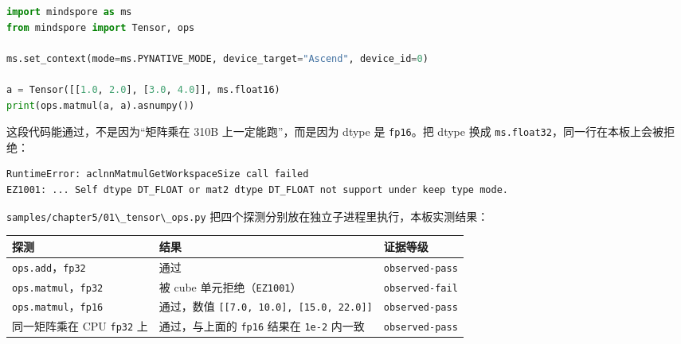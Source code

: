 \begin{lstlisting}[language=Python]
import mindspore as ms
from mindspore import Tensor, ops

ms.set_context(mode=ms.PYNATIVE_MODE, device_target="Ascend", device_id=0)

a = Tensor([[1.0, 2.0], [3.0, 4.0]], ms.float16)
print(ops.matmul(a, a).asnumpy())
\end{lstlisting}

这段代码能通过，不是因为``矩阵乘在 310B 上一定能跑''，而是因为 dtype 是
\passthrough{\lstinline!fp16!}。把 dtype 换成
\passthrough{\lstinline!ms.float32!}，同一行在本板上会被拒绝：

\begin{lstlisting}
RuntimeError: aclnnMatmulGetWorkspaceSize call failed
EZ1001: ... Self dtype DT_FLOAT or mat2 dtype DT_FLOAT not support under keep type mode.
\end{lstlisting}

\passthrough{\lstinline!samples/chapter5/01\_tensor\_ops.py!}
把四个探测分别放在独立子进程里执行，本板实测结果：

\begin{longtable}[]{@{}
  >{\raggedright\arraybackslash}p{}
  >{\raggedright\arraybackslash}p{}
  >{\raggedright\arraybackslash}p{}@{}}
\toprule\noalign{}
\begin{minipage}[b]{\linewidth}\raggedright
探测
\end{minipage} & \begin{minipage}[b]{\linewidth}\raggedright
结果
\end{minipage} & \begin{minipage}[b]{\linewidth}\raggedright
证据等级
\end{minipage} \\
\midrule\noalign{}
\endhead
\bottomrule\noalign{}
\endlastfoot
\passthrough{\lstinline!ops.add!}，\passthrough{\lstinline!fp32!} & 通过
& \passthrough{\lstinline!observed-pass!} \\
\passthrough{\lstinline!ops.matmul!}，\passthrough{\lstinline!fp32!} &
被 cube 单元拒绝（\passthrough{\lstinline!EZ1001!}） &
\passthrough{\lstinline!observed-fail!} \\
\passthrough{\lstinline!ops.matmul!}，\passthrough{\lstinline!fp16!} &
通过，数值 \passthrough{\lstinline![[7.0, 10.0], [15.0, 22.0]]!} &
\passthrough{\lstinline!observed-pass!} \\
同一矩阵乘在 CPU \passthrough{\lstinline!fp32!} 上 & 通过，与上面的
\passthrough{\lstinline!fp16!} 结果在 \passthrough{\lstinline!1e-2!}
内一致 & \passthrough{\lstinline!observed-pass!} \\
\end{longtable}

